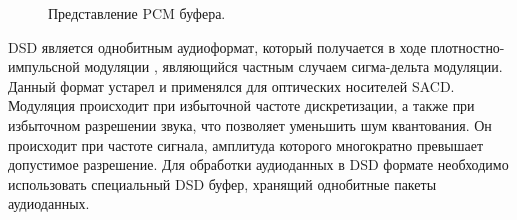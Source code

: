 		\begin{figure}[!h]
			\caption{Представление PCM буфера.}
			\label{fig:PCMBuffer}
		\end{figure}

		\par DSD является однобитным аудиоформат, который получается в ходе \newline плотностно-импульсной модуляции \cite{PCM:DSD}, являющийся частным случаем сигма-дельта модуляции.
		Данный формат устарел и применялся для оптических носителей SACD. 
		Модуляция происходит при избыточной частоте дискретизации, а также при избыточном разрешении звука, 
		что позволяет уменьшить шум квантования. Он происходит при частоте сигнала, 
		амплитуда которого многократно превышает допустимое разрешение. 
		Для обработки аудиоданных в DSD формате необходимо использовать специальный DSD буфер, 
		хранящий однобитные пакеты аудиоданных.

